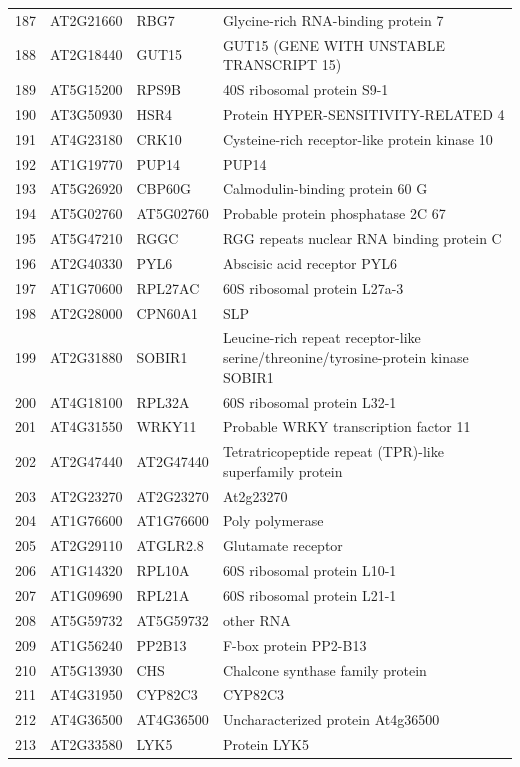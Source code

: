 \documentclass[11pt]{article}
\begin{document}
\begin{center}
\begin{tabular}{rlll}
187 & AT2G21660 & RBG7 & Glycine-rich RNA-binding protein 7\\
188 & AT2G18440 & GUT15 & GUT15 (GENE WITH UNSTABLE TRANSCRIPT 15)\\
189 & AT5G15200 & RPS9B & 40S ribosomal protein S9-1\\
190 & AT3G50930 & HSR4 & Protein HYPER-SENSITIVITY-RELATED 4\\
191 & AT4G23180 & CRK10 & Cysteine-rich receptor-like protein kinase 10\\
192 & AT1G19770 & PUP14 & PUP14\\
193 & AT5G26920 & CBP60G & Calmodulin-binding protein 60 G\\
194 & AT5G02760 & AT5G02760 & Probable protein phosphatase 2C 67\\
195 & AT5G47210 & RGGC & RGG repeats nuclear RNA binding protein C\\
196 & AT2G40330 & PYL6 & Abscisic acid receptor PYL6\\
197 & AT1G70600 & RPL27AC & 60S ribosomal protein L27a-3\\
198 & AT2G28000 & CPN60A1 & SLP\\
199 & AT2G31880 & SOBIR1 & Leucine-rich repeat receptor-like serine/threonine/tyrosine-protein kinase SOBIR1\\
200 & AT4G18100 & RPL32A & 60S ribosomal protein L32-1\\
201 & AT4G31550 & WRKY11 & Probable WRKY transcription factor 11\\
202 & AT2G47440 & AT2G47440 & Tetratricopeptide repeat (TPR)-like superfamily protein\\
203 & AT2G23270 & AT2G23270 & At2g23270\\
204 & AT1G76600 & AT1G76600 & Poly polymerase\\
205 & AT2G29110 & ATGLR2.8 & Glutamate receptor\\
206 & AT1G14320 & RPL10A & 60S ribosomal protein L10-1\\
207 & AT1G09690 & RPL21A & 60S ribosomal protein L21-1\\
208 & AT5G59732 & AT5G59732 & other RNA\\
209 & AT1G56240 & PP2B13 & F-box protein PP2-B13\\
210 & AT5G13930 & CHS & Chalcone synthase family protein\\
211 & AT4G31950 & CYP82C3 & CYP82C3\\
212 & AT4G36500 & AT4G36500 & Uncharacterized protein At4g36500\\
213 & AT2G33580 & LYK5 & Protein LYK5\\

\end{tabular}
\end{center}
\end{document}
